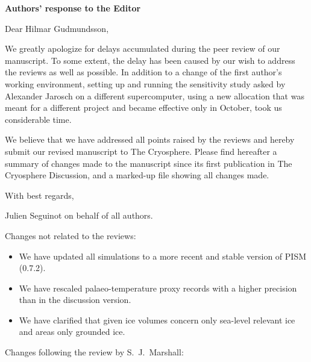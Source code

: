 


\textbf{Authors' response to the Editor}
\bigskip

Dear Hilmar Gudmundsson,

We greatly apologize for delays accumulated during the peer review of our
manuscript. To some extent, the delay has been caused by our wish to address
the reviews as well as possible. In addition to a change of the first author's
working environment, setting up and running the sensitivity study asked by
Alexander Jarosch on a different supercomputer, using a new allocation that was
meant for a different project and became effective only in October, took us
considerable time.

We believe that we have addressed all points raised by the reviews and hereby
submit our revised manuscript to The Cryosphere. Please find hereafter a
summary of changes made to the manuscript since its first publication in The
Cryosphere Discussion, and a marked-up file showing all changes made.

With best regards,

Julien Seguinot on behalf of all authors.

\bigskip

Changes not related to the reviews:

\begin{itemize}

    \item We have updated all simulations to a more recent and stable version
    of PISM (0.7.2).

    \item We have rescaled palaeo-temperature proxy records with a higher
    precision than in the discussion version.

    \item We have clarified that given ice volumes concern only sea-level
    relevant ice and areas only grounded ice.

\end{itemize}

Changes following the review by S.~J.~Marshall:


